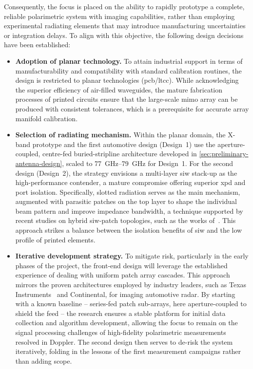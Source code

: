 Consequently, the focus is placed on the ability to rapidly prototype a complete, reliable polarimetric system with imaging capabilities, rather than employing experimental radiating elements that may introduce manufacturing uncertainties or integration delays.
To align with this objective, the following design decisions have been established:

\begin{itemize}
    \item \textbf{Adoption of planar technology.}
    To attain industrial support in terms of manufacturability and compatibility with standard calibration routines, the design is restricted to planar technologies (\gls{pcb}/\gls{ltcc}).
    While acknowledging the superior efficiency of air-filled waveguides, the mature fabrication processes of printed circuits ensure that the large-scale \gls{mimo} array can be produced with consistent tolerances, which is a prerequisite for accurate array manifold calibration.

    \item \textbf{Selection of radiating mechanism.}
    Within the planar domain, the X-band prototype and the first automotive design (Design~1) use the aperture-coupled, centre-fed buried-stripline architecture developed in \cref{sec:preliminary-antenna-design}, scaled to \qtyrange{77}{79}{\giga\hertz} for Design~1.
    For the second design (Design~2), the strategy envisions a multi-layer \gls{siw} stack-up as the high-performance contender, a mature compromise offering superior \gls{xpd} and port isolation.
    Specifically, slotted radiation serves as the main mechanism, augmented with parasitic patches on the top layer to shape the individual beam pattern and improve impedance bandwidth, a technique supported by recent studies on hybrid \gls{siw}-patch topologies, such as the works of~\textcite{puskely5GSIWBasedPhased2022,yangMillimeterWaveDualPolarizedDifferentially2020}.
    This approach strikes a balance between the isolation benefits of \gls{siw} and the low profile of printed elements.

    \item \textbf{Iterative development strategy.}
    To mitigate risk, particularly in the early phases of the project, the front-end design will leverage the established experience of dealing with uniform patch array cascades.
    This approach mirrors the proven architectures employed by industry leaders, such as Texas Instruments~\parencite{texasInstrumentsAwrxCascadedRadar2020} and Continental, for imaging automotive radar.
    By starting with a known baseline -- series-fed patch sub-arrays, here aperture-coupled to shield the feed -- the research ensures a stable platform for initial data collection and algorithm development, allowing the focus to remain on the signal processing challenges of high-fidelity polarimetric measurements resolved in Doppler.
    The second design then serves to de-risk the system iteratively, folding in the lessons of the first measurement campaigns rather than adding scope.


\end{itemize}
